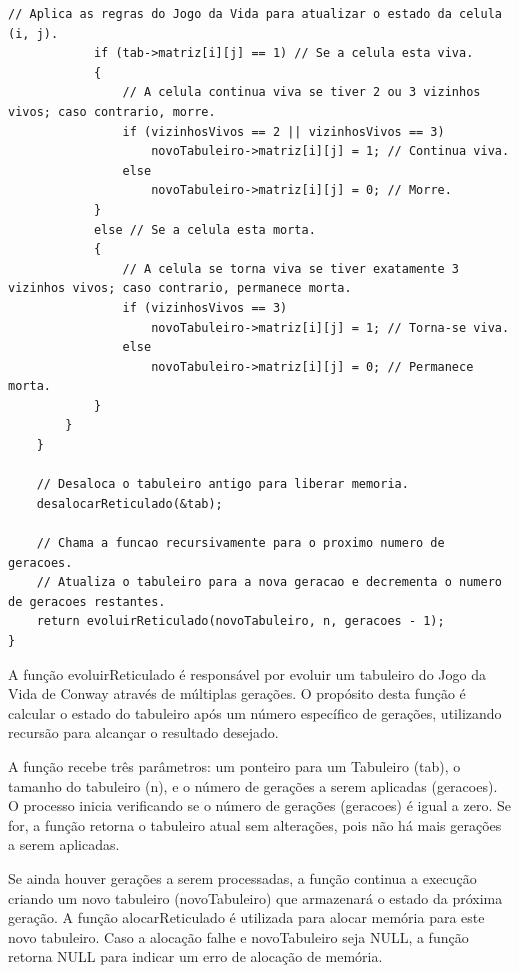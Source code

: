 \documentclass{article}
\begin{document}
\begin{lstlisting}[caption={},label={lst:cod1},language={[x86masm]Assembler}]
            // Aplica as regras do Jogo da Vida para atualizar o estado da celula (i, j).
            if (tab->matriz[i][j] == 1) // Se a celula esta viva.
            {
                // A celula continua viva se tiver 2 ou 3 vizinhos vivos; caso contrario, morre.
                if (vizinhosVivos == 2 || vizinhosVivos == 3)
                    novoTabuleiro->matriz[i][j] = 1; // Continua viva.
                else
                    novoTabuleiro->matriz[i][j] = 0; // Morre.
            }
            else // Se a celula esta morta.
            {
                // A celula se torna viva se tiver exatamente 3 vizinhos vivos; caso contrario, permanece morta.
                if (vizinhosVivos == 3)
                    novoTabuleiro->matriz[i][j] = 1; // Torna-se viva.
                else
                    novoTabuleiro->matriz[i][j] = 0; // Permanece morta.
            }
        }
    }

    // Desaloca o tabuleiro antigo para liberar memoria.
    desalocarReticulado(&tab);

    // Chama a funcao recursivamente para o proximo numero de geracoes.
    // Atualiza o tabuleiro para a nova geracao e decrementa o numero de geracoes restantes.
    return evoluirReticulado(novoTabuleiro, n, geracoes - 1);
}
 \end{lstlisting}

\par A função evoluirReticulado é responsável por evoluir um tabuleiro do Jogo da Vida de Conway através de múltiplas gerações. O propósito desta função é calcular o estado do tabuleiro após um número específico de gerações, utilizando recursão para alcançar o resultado desejado.

\par A função recebe três parâmetros: um ponteiro para um Tabuleiro (tab), o tamanho do tabuleiro (n), e o número de gerações a serem aplicadas (geracoes). O processo inicia verificando se o número de gerações (geracoes) é igual a zero. Se for, a função retorna o tabuleiro atual sem alterações, pois não há mais gerações a serem aplicadas.

\par Se ainda houver gerações a serem processadas, a função continua a execução criando um novo tabuleiro (novoTabuleiro) que armazenará o estado da próxima geração. A função alocarReticulado é utilizada para alocar memória para este novo tabuleiro. Caso a alocação falhe e novoTabuleiro seja NULL, a função retorna NULL para indicar um erro de alocação de memória.
\end{document}
